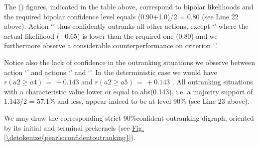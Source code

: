 \documentclass[a4paper,12pt,english]{sphinxhowto}
\begin{document}
\sphinxAtStartPar
The () figures, indicated in the table above, correspond to bipolar likelihoods and the required bipolar confidence level equals (0.90+1.0)/2 = 0.80 (see Line 22 above). Action ‘’ thus confidently outranks all other actions, except ‘’ where the actual likelihood (+0.65) is lower than the required one (0.80) and we furthermore observe a considerable counter\sphinxhyphen{}performance on criterion ‘’.

\sphinxAtStartPar
Notice also the lack of confidence in the outranking situations we observe between action ‘’ and actions ‘’ and ‘’. In the deterministic case we would have \(r(a2 \geq a4) \,=\, -0.143\) and \(r(a2 \geq a5) \,=\, +0.143\) . All outranking situations with a characteristic value lower or equal to abs(0.143), i.e. a majority support of 1.143/2 = 57.1\% and less, appear indeed to be  at level 90\% (see Line 23 above).

\sphinxAtStartPar
We may draw the corresponding strict 90\%\sphinxhyphen{}confident outranking digraph, oriented by its initial and terminal  prekernels (see \hyperref[\detokenize{pearls:confidentoutranking}]{Fig.\@ \ref{\detokenize{pearls:confidentoutranking}}}).
\end{document}
